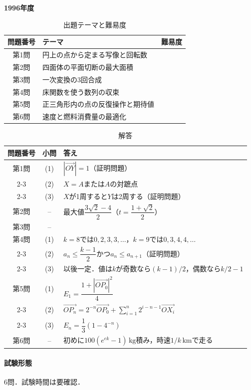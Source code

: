 \documentclass[../../main.tex]{subfiles}
\begin{document}
\begin{center}
  {\fontsize{48pt}{58pt}\selectfont \textbf{1996}\normalsize\textbf{年度}}
\end{center}

\begin{table}[htb]
  \centering
  \caption{出題テーマと難易度}
  \begin{tabular}{|c|p{9cm}|c|}
    \hline
    \textbf{問題番号} & \textbf{テーマ} & \textbf{難易度} \\
    \hline
    第1問 & 円上の点から定まる写像と回転数 & \\
    \hline
    第2問 & 四面体の平面切断の最大面積 & \\
    \hline
    第3問 & 一次変換の3回合成 & \\
    \hline
    第4問 & 床関数を使う数列の収束 & \\
    \hline
    第5問 & 正三角形内の点の反復操作と期待値 & \\
    \hline
    第6問 & 速度と燃料消費量の最適化 & \\
    \hline
  \end{tabular}
\end{table}

\begin{table}[htb]
  \centering
  \caption{解答}
  \renewcommand{\arraystretch}{1.4}
  \begin{tabular}{|c|c|p{9cm}|}
    \hline
    \textbf{問題番号} & \textbf{小問} & \textbf{答え} \\
    \hline
    第1問 & (1) & $|\overrightarrow{OY}|=1$（証明問題） \\
    \cline{2-3}
    & (2) & $X=A$または$A$の対蹠点 \\
    \cline{2-3}
    & (3) & $X$が1周すると$Y$は2周する（証明問題） \\
    \hline
    第2問 & -- & 最大値$\dfrac{3\sqrt{2}-4}{2}$（$t=\dfrac{1+\sqrt{2}}{2}$） \\
    \hline
    第3問 & -- &  \\
    \hline
    第4問 & (1) & $k=8$では$0,2,3,3,\ldots$，$k=9$では$0,3,4,4,\ldots$ \\
    \cline{2-3}
    & (2) & $a_n\le\dfrac{k-1}{2}$かつ$a_n\le a_{n+1}$（証明問題） \\
    \cline{2-3}
    & (3) & 以後一定．値は$k$が奇数なら$(k-1)/2$，偶数なら$k/2-1$ \\
    \hline
    第5問 & (1) & $E_1=\dfrac{1+|\overrightarrow{OP_0}|^2}{4}$ \\
    \cline{2-3}
    & (2) & $\overrightarrow{OP_n}=2^{-n}\overrightarrow{OP_0}+\sum_{i=1}^{n}2^{i-n-1}\overrightarrow{OX_i}$ \\
    \cline{2-3}
    & (3) & $E_n=\dfrac{1}{3}\left(1-4^{-n}\right)$ \\
    \hline
    第6問 & -- & 初めに$100(e^{ek}-1)\,\mathrm{kg}$積み，時速$1/k\,\mathrm{km}$で走る \\
    \hline
  \end{tabular}
\end{table}

\paragraph{試験形態}
6問．試験時間は要確認．
\end{document}
